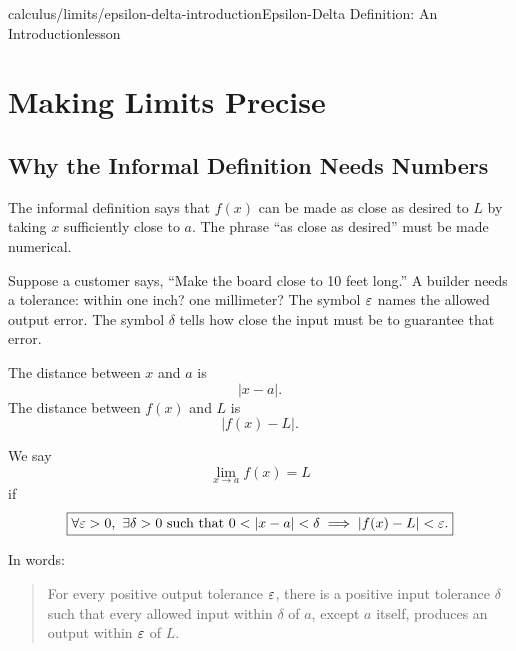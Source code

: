 \begin{webpage}{calculus/limits/epsilon-delta-introduction}{Epsilon-Delta Definition: An Introduction}{lesson}
\chapter{Making Limits Precise}

\section{Why the Informal Definition Needs Numbers}


The informal definition says that \(f(x)\) can be made as close as desired to \(L\) by taking \(x\) sufficiently close to \(a\). The phrase ``as close as desired'' must be made numerical.

\begin{bgconcept}
Suppose a customer says, ``Make the board close to 10 feet long.'' A builder needs a tolerance: within one inch? one millimeter? The symbol \(\eps\) names the allowed output error. The symbol \(\delta\) tells how close the input must be to guarantee that error.
\end{bgconcept}

The distance between \(x\) and \(a\) is
\[
  |x-a|.
\]
The distance between \(f(x)\) and \(L\) is
\[
  |f(x)-L|.
\]

\begin{bgdefinition}[title={Formal \(\eps\)-\(\delta\) Definition}]
We say
\[
  \lim_{x\to a}f(x)=L
\]
if
\[
  \boxed{\forall\eps>0,\ \exists\delta>0\text{ such that }
  0<|x-a|<\delta\implies|f(x)-L|<\eps.}
\]
\end{bgdefinition}

In words:

\begin{quote}
For every positive output tolerance \(\eps\), there is a positive input tolerance \(\delta\) such that every allowed input within \(\delta\) of \(a\), except \(a\) itself, produces an output within \(\eps\) of \(L\).
\end{quote}


\end{webpage}
